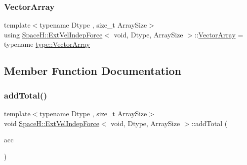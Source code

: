 \mbox{\label{struct_space_h_1_1_ext_vel_indep_force_3_01void_00_01_dtype_00_01_array_size_01_4_a2f23924c3395826cf1701b5b0c74be50}} 
\subsubsection{\texorpdfstring{Vector\+Array}{VectorArray}}
{\footnotesize\ttfamily template$<$typename Dtype , size\+\_\+t Array\+Size$>$ \\
using \mbox{\hyperlink{struct_space_h_1_1_ext_vel_indep_force}{Space\+H\+::\+Ext\+Vel\+Indep\+Force}}$<$ void, Dtype, Array\+Size $>$\+::\mbox{\hyperlink{struct_space_h_1_1_ext_vel_indep_force_3_01void_00_01_dtype_00_01_array_size_01_4_a2f23924c3395826cf1701b5b0c74be50}{Vector\+Array}} =  typename \mbox{\hyperlink{struct_space_h_1_1_proto_type_a622b8e122b33bb4966a02299fb7b82d6}{type\+::\+Vector\+Array}}}



\subsection{Member Function Documentation}
\mbox{\label{struct_space_h_1_1_ext_vel_indep_force_3_01void_00_01_dtype_00_01_array_size_01_4_a358d0f758147a31d7d9e41b8e4d7fda7}} 
\subsubsection{\texorpdfstring{add\+Total()}{addTotal()}}
{\footnotesize\ttfamily template$<$typename Dtype , size\+\_\+t Array\+Size$>$ \\
void \mbox{\hyperlink{struct_space_h_1_1_ext_vel_indep_force}{Space\+H\+::\+Ext\+Vel\+Indep\+Force}}$<$ void, Dtype, Array\+Size $>$\+::add\+Total (\begin{DoxyParamCaption}\item[{\mbox{\hyperlink{struct_space_h_1_1_ext_vel_indep_force_3_01void_00_01_dtype_00_01_array_size_01_4_a2f23924c3395826cf1701b5b0c74be50}{Vector\+Array}} \&}]{acc }\end{DoxyParamCaption})\hspace{0.3cm}{\ttfamily [inline]}}

